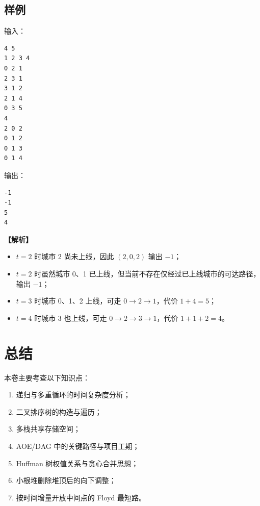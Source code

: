 \documentclass[12pt,a4paper]{ctexart}
\newenvironment{solution}
{\par\noindent\textbf{\color{answerblue}【解析】}\ }
{\par}
\begin{document}
\subsection*{样例}

输入：
\begin{lstlisting}[language={}]
4 5
1 2 3 4
0 2 1
2 3 1
3 1 2
2 1 4
0 3 5
4
2 0 2
0 1 2
0 1 3
0 1 4
\end{lstlisting}

输出：
\begin{lstlisting}[language={}]
-1
-1
5
4
\end{lstlisting}

\begin{solution}
\begin{itemize}
  \item $t=2$ 时城市 2 尚未上线，因此 $(2,0,2)$ 输出 $-1$；
  \item $t=2$ 时虽然城市 0、1 已上线，但当前不存在仅经过已上线城市的可达路径，输出 $-1$；
  \item $t=3$ 时城市 0、1、2 上线，可走 $0\to2\to1$，代价 $1+4=5$；
  \item $t=4$ 时城市 3 也上线，可走 $0\to2\to3\to1$，代价 $1+1+2=4$。
\end{itemize}
\end{solution}

\section*{总结}

本卷主要考查以下知识点：
\begin{enumerate}
  \item 递归与多重循环的时间复杂度分析；
  \item 二叉排序树的构造与遍历；
  \item 多栈共享存储空间；
  \item AOE/DAG 中的关键路径与项目工期；
  \item Huffman 树权值关系与贪心合并思想；
  \item 小根堆删除堆顶后的向下调整；
  \item 按时间增量开放中间点的 Floyd 最短路。
\end{enumerate}
\end{document}
